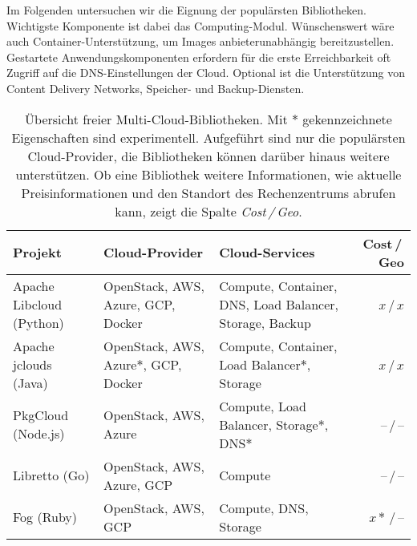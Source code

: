 Im Folgenden untersuchen wir die Eignung der populärsten Bibliotheken. Wichtigste Komponente ist dabei das Computing-Modul. Wünschenswert wäre auch Container-Unterstützung, um Images anbieterunabhängig bereitzustellen. Gestartete Anwendungskomponenten erfordern für die erste Erreichbarkeit oft Zugriff auf die DNS-Einstellungen der Cloud. Optional ist die Unterstützung von Content Delivery Networks, Speicher- und Backup-Diensten.

\begin{table*}\centering
	\begin{minipage}{\textwidth}
	\caption{Übersicht freier Multi-Cloud-Bibliotheken. Mit $*$ gekennzeichnete Eigenschaften sind experimentell. Aufgeführt sind nur die populärsten Cloud-Provider, die Bibliotheken können darüber hinaus weitere unterstützen. Ob eine Bibliothek weitere Informationen, wie aktuelle Preisinformationen und den Standort des Rechenzentrums abrufen kann, zeigt die Spalte \emph{Cost\,/\,Geo}.}
	\begin{tabularx}{\textwidth}{>{\centering}XXXr} \toprule
		Projekt & Cloud-Provider & Cloud-Services & Cost\,/\,Geo\\ \midrule
		Apache Libcloud (Python)\footnotemark & OpenStack, AWS, Azure, GCP, Docker & Compute, Container, DNS, Load Balancer, Storage, Backup & $x$\,/\,$x$\\
		Apache jclouds (Java)\footnotemark & OpenStack, AWS, Azure$*$, GCP, Docker & Compute, Container, Load Balancer$*$, Storage & $x$\,/\,$x$\\
		PkgCloud (Node.js)\footnotemark & OpenStack, AWS, Azure & Compute, Load Balancer, Storage$*$, DNS$*$ & --\,/\,--\\
		Libretto (Go)\footnotemark & OpenStack, AWS, Azure, GCP & Compute & --\,/\,--\\
		Fog (Ruby)\footnotemark & OpenStack, AWS, GCP & Compute, DNS, Storage & $x*$\,/\,--\\
		\bottomrule
	\end{tabularx}
	\label{tab:bibliotheken}
	\vspace{150pt}
\end{minipage}  
\end{table*}

